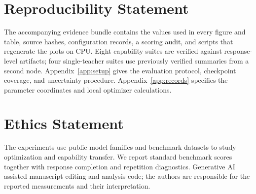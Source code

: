 \section*{Reproducibility Statement}

The accompanying evidence bundle contains the values used in every figure and table, source hashes, configuration records, a scoring audit, and scripts that regenerate the plots on CPU. Eight capability suites are verified against response-level artifacts; four single-teacher suites use previously verified summaries from a second node. Appendix~\ref{app:setup} gives the evaluation protocol, checkpoint coverage, and uncertainty procedure. Appendix~\ref{app:records} specifies the parameter coordinates and local optimizer calculations.

\section*{Ethics Statement}

The experiments use public model families and benchmark datasets to study optimization and capability transfer. We report standard benchmark scores together with response completion and repetition diagnostics. Generative AI assisted manuscript editing and analysis code; the authors are responsible for the reported measurements and their interpretation.
